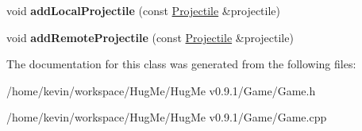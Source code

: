 \begin{DoxyCompactItemize}
\item 
\hypertarget{classGame_a6b906a1b84bf44af941965dc0328e4c9}{
void {\bfseries addLocalProjectile} (const \hyperlink{classProjectile}{Projectile} \&projectile)}
\label{classGame_a6b906a1b84bf44af941965dc0328e4c9}

\item 
\hypertarget{classGame_a548fc57b9d7ab59fc00e2fcdcf373950}{
void {\bfseries addRemoteProjectile} (const \hyperlink{classProjectile}{Projectile} \&projectile)}
\label{classGame_a548fc57b9d7ab59fc00e2fcdcf373950}

\end{DoxyCompactItemize}


The documentation for this class was generated from the following files:\begin{DoxyCompactItemize}
\item 
/home/kevin/workspace/HugMe/HugMe v0.9.1/Game/Game.h\item 
/home/kevin/workspace/HugMe/HugMe v0.9.1/Game/Game.cpp\end{DoxyCompactItemize}
